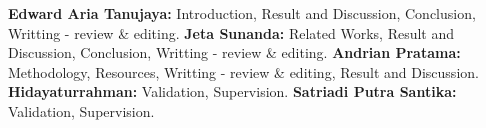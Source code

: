 \documentclass[conference,a4paper]{IEEEtran}
\begin{document}
\textbf{Edward Aria Tanujaya:} Introduction, Result and Discussion, Conclusion, Writting - review \& editing. \textbf{Jeta Sunanda:} Related Works, Result and Discussion, Conclusion, Writting - review \& editing. \textbf{Andrian Pratama:} Methodology, Resources, Writting - review \& editing, Result and Discussion. \textbf{Hidayaturrahman:} Validation, Supervision. \textbf{Satriadi Putra Santika:} Validation, Supervision.
 


\end{document}
